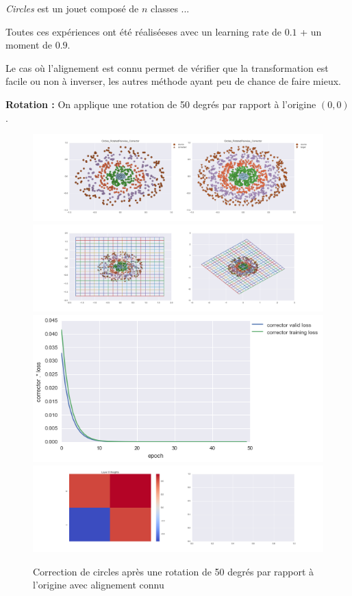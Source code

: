 
\emph{Circles} est un jouet composé de $n$ classes ...

Toutes ces expériences ont été réaliséeses avec un learning rate de $0.1$ + un moment de $0.9$.



Le cas où l'alignement est connu permet de vérifier que la transformation est facile ou non 
à inverser, les autres méthode ayant peu de chance de faire mieux.

{\Large \textbf{Rotation :}} On applique une rotation de 50 degrés par rapport à l'origine $(0,0)$.

\begin{figure}[H] %
\centering
\includegraphics[width=\linewidth]{fig/24-05-2016/circles/Circles_RotatedPairwise_Corrector-DATA.png}
\includegraphics[width=\linewidth]{fig/24-05-2016/circles/Circles_RotatedPairwise_Corrector-GridCheck.png}
\includegraphics[width=0.45\linewidth]{fig/24-05-2016/circles/Circles_RotatedPairwise_Corrector-Learning_curve.png}
\includegraphics[width=\linewidth]{fig/24-05-2016/circles/Circles_RotatedPairwise_Corrector-W.png}
\caption{Correction de circles après une rotation de 50 degrés par rapport à l'origine avec alignement connu}
\label{fig:recap-circles-rot-pairwise}
\end{figure}

